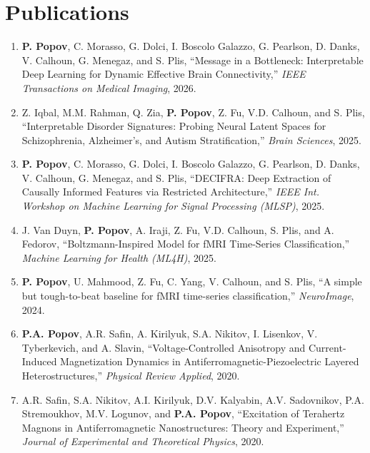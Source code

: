 \documentclass[11pt,a4paper]{article}
\newcommand{\me}[1]{\textbf{#1}} %
\begin{document}
\section*{Publications}
{\small
\begin{enumerate}[leftmargin=*,itemsep=1pt,label=\arabic*.]

\item \me{P. Popov}, C. Morasso, G. Dolci, I. Boscolo Galazzo, G. Pearlson, D. Danks, V. Calhoun, G. Menegaz, and S. Plis, ``Message in a Bottleneck: Interpretable Deep Learning for Dynamic Effective Brain Connectivity,'' \textit{IEEE Transactions on Medical Imaging}, 2026.

\item Z. Iqbal, M.M. Rahman, Q. Zia, \me{P. Popov}, Z. Fu, V.D. Calhoun, and S. Plis, ``Interpretable Disorder Signatures: Probing Neural Latent Spaces for Schizophrenia, Alzheimer's, and Autism Stratification,'' \textit{Brain Sciences}, 2025.

\item \me{P. Popov}, C. Morasso, G. Dolci, I. Boscolo Galazzo, G. Pearlson, D. Danks, V. Calhoun, G. Menegaz, and S. Plis, ``DECIFRA: Deep Extraction of Causally Informed Features via Restricted Architecture,'' \textit{IEEE Int. Workshop on Machine Learning for Signal Processing (MLSP)}, 2025.

\item J. Van Duyn, \me{P. Popov}, A. Iraji, Z. Fu, V.D. Calhoun, S. Plis, and A. Fedorov, ``Boltzmann-Inspired Model for fMRI Time-Series Classification,'' \textit{Machine Learning for Health (ML4H)}, 2025.

\item \me{P. Popov}, U. Mahmood, Z. Fu, C. Yang, V. Calhoun, and S. Plis, ``A simple but tough-to-beat baseline for fMRI time-series classification,'' \textit{NeuroImage}, 2024.

\item \me{P.A. Popov}, A.R. Safin, A. Kirilyuk, S.A. Nikitov, I. Lisenkov, V. Tyberkevich, and A. Slavin, ``Voltage-Controlled Anisotropy and Current-Induced Magnetization Dynamics in Antiferromagnetic-Piezoelectric Layered Heterostructures,'' \textit{Physical Review Applied}, 2020.

\item A.R. Safin, S.A. Nikitov, A.I. Kirilyuk, D.V. Kalyabin, A.V. Sadovnikov, P.A. Stremoukhov, M.V. Logunov, and \me{P.A. Popov}, ``Excitation of Terahertz Magnons in Antiferromagnetic Nanostructures: Theory and Experiment,'' \textit{Journal of Experimental and Theoretical Physics}, 2020.


\end{enumerate}}
\end{document}
